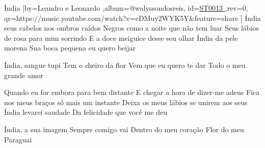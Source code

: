\beginsong
{Índia %
}[by={Leandro e Leonardo %
},album={@walyssondosreis},
id={\href{https://music.youtube.com/watch?v=eDMuy2WYK5Y&feature=share %
}{ST0013 %
}},rev={0}, %
qr={https://music.youtube.com/watch?v=eDMuy2WYK5Y&feature=share %
}]
\beginverse
Índia seus cabelos nos ombros caídos
Negros como a noite que não tem luar
Seus lábios de rosa para mim sorrindo
E a doce meiguice desse seu olhar
Índia da pele morena
Sua boca pequena eu quero beijar
\endverse

\beginchorus
Índia, sangue tupi
Tem o cheiro da flor
Vem que eu quero te dar
Todo o meu grande amor
\endchorus

\beginverse
Quando eu for embora para bem distante
E chegar a hora de dizer-me adeus
Fica nos meus braços só mais um instante
Deixa os meus lábios se unirem aos seus
Índia levarei saudade
Da felicidade que você me deu
\endverse

\beginverse
Índia, a sua imagem
Sempre comigo vai
Dentro do meu coração
Flor do meu Paraguai
\endverse

